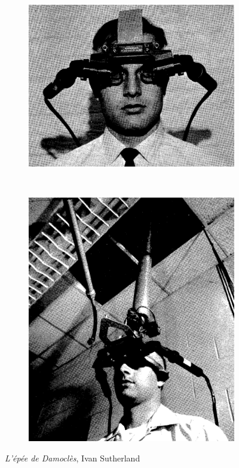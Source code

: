 \documentclass[a4,12pt]{scrartcl}
\begin{document}
\begin{figure}[H]
	\centering
	\begin{subfigure}{.4\textwidth}
	  \centering
	  \includegraphics[width=\linewidth]{sutherland-1}
	\end{subfigure}
	~
	\begin{subfigure}{.4\textwidth}
	  \centering
	  \includegraphics[width=0.8\linewidth]{sutherland-2}
	\end{subfigure}
 	\caption{\emph{L’épée de Damoclès}, Ivan Sutherland \cite{Sutherland68}}
\end{figure}
\end{document}
